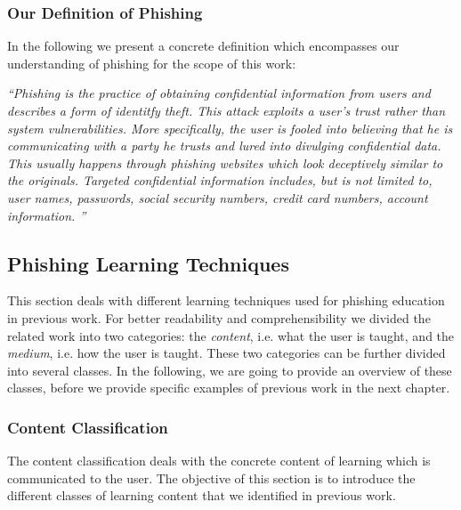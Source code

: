 \subsubsection{Our Definition of Phishing}
In the following we present a concrete definition which encompasses our understanding of phishing for the scope of this work:

\begin{center}
\textit{``Phishing is the practice of obtaining confidential information from users and describes a form of identitfy theft. This attack exploits a user's trust rather than system vulnerabilities. More specifically, the user is fooled into believing that he is communicating with a party he trusts and lured into divulging confidential data. This usually happens through phishing websites which look deceptively similar to the originals. Targeted confidential information includes, but is not limited to, user names, passwords, social security numbers, credit card numbers, account information.
''}~\cite{jakobsson2006phishing}
\end{center}

\subsection{Phishing Learning Techniques}

This section deals with different learning techniques used for phishing education in previous work.
 For better readability and comprehensibility we divided the related work into two categories: the \textit{content}, i.e.
 what the user is taught, and the 
\textit{medium}, i.e. how the user is taught.
These two categories can be further divided into several classes. 
In the following, we are going to provide an overview of these classes, before we provide specific examples of previous work in the next chapter.


\subsubsection{Content Classification}
\label{s:content_classification}
The content classification deals with the concrete content of learning which is communicated to the user. 
The objective of this section is to introduce the different classes of learning content that we identified in previous work.

